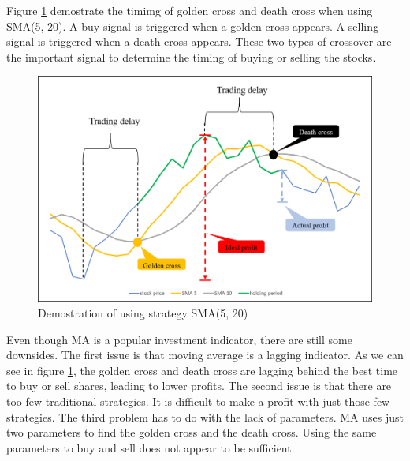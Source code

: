\documentclass[../Proposed Method.tex]{subfiles}
\begin{document}

Figure \ref{cross_demo} demostrate the timimg of golden cross and death cross when using SMA(5, 20). A buy signal is triggered when a golden cross appears. A selling signal is triggered when a death cross appears. These two types of crossover are the important signal to determine the timing of buying or selling the stocks.

\begin{figure}[H]
    \centering
    \includegraphics[scale = 0.6] {figure/cross1.png}
    \caption{Demostration of using strategy SMA(5, 20)}
    \label{cross_demo}
\end{figure}

Even though MA is a popular investment indicator, there are still some downsides. The first issue is that moving average is a lagging indicator. As we can see in figure \ref{cross_demo}, the golden cross and death cross are lagging behind the best time to buy or sell shares, leading to lower profits. The second issue is that there are too few traditional strategies. It is difficult to make a profit with just those few strategies. The third problem has to do with the lack of parameters. MA uses just two parameters to find the golden cross and the death cross. Using the same parameters to buy and sell does not appear to be sufficient.
\end{document}
